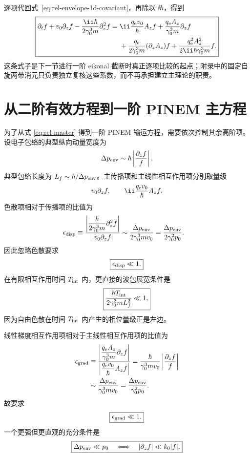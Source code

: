 逐项代回式~\eqref{eq:rel-envelope-1d-covariant}，再除以 $\ii\hbar$，得到
\begin{equation}
\boxed{
\begin{aligned}
\partial_tf+v_0\partial_zf
-\frac{\ii\hbar}{2\gamma_0^3m}\partial_z^2f
={}&\ii\frac{q_{\rm e}v_0}{\hbar}A_zf
+\frac{q_{\rm e}A_z}{\gamma_0^3m}\partial_zf\\
&+\frac{q_{\rm e}}{2\gamma_0^3m}(\partial_zA_z)f
+\frac{q_{\rm e}^2A_z^2}{2\ii\hbar\gamma_0^3m}f.
\end{aligned}}
\label{eq:rel-master}
\end{equation}
这条式子是下一节进行一阶 eikonal 截断时真正逐项比较的起点；附录中的固定自旋两带消元只负责独立复核这些系数，而不再承担建立主理论的职责。



\section{从二阶有效方程到一阶 PINEM 主方程}

为了从式 \eqref{eq:rel-master} 得到一阶 PINEM 输运方程，需要依次控制其余高阶项。设电子包络的典型纵向动量宽度为
\[
 \Delta p_{\rm env}\sim\hbar\left|\frac{\partial_z f}{f}\right|,
\]
典型包络长度为 $L_f\sim\hbar/\Delta p_{\rm env}$。主传播项和主线性相互作用项分别取量级
\[
 v_0\partial_zf,
 \qquad
 \ii\frac{q_{\rm e}v_0}{\hbar}A_zf.
\]
色散项相对于传播项的比值为
\begin{align}
 \epsilon_{\rm disp}
 &\equiv
 \frac{\left|\dfrac{\hbar}{2\gamma_0^3m}\partial_z^2f\right|}
 {\left|v_0\partial_zf\right|}
 \sim\frac{\Delta p_{\rm env}}{2\gamma_0^3mv_0}
 =\frac{\Delta p_{\rm env}}{2\gamma_0^2p_0}.
 \label{eq:eps-disp}
\end{align}
因此忽略色散要求
\begin{equation}
 \boxed{\epsilon_{\rm disp}\ll1.}
 \label{eq:disp-condition}
\end{equation}
在有限相互作用时间 $T_{\rm int}$ 内，更直接的波包展宽条件是
\begin{equation}
 \boxed{
 \frac{\hbar T_{\rm int}}{2\gamma_0^3mL_f^2}\ll1,}
 \label{eq:disp-time-condition}
\end{equation}
因为自由色散在时间 $T_{\rm int}$ 内产生的相位量级正是左边。

线性梯度相互作用项相对于主线性相互作用项的比值为
\begin{align}
 \epsilon_{\rm grad}
 &\equiv
 \frac{\left|\dfrac{q_{\rm e}A_z}{\gamma_0^3m}\partial_zf\right|}
 {\left|\dfrac{q_{\rm e}v_0}{\hbar}A_zf\right|}
 =\frac{\hbar}{\gamma_0^3mv_0}
 \left|\frac{\partial_zf}{f}\right|\\
 &\sim\frac{\Delta p_{\rm env}}{\gamma_0^3mv_0}
 =\frac{\Delta p_{\rm env}}{\gamma_0^2p_0}.
 \label{eq:eps-grad}
\end{align}
故要求
\begin{equation}
 \boxed{\epsilon_{\rm grad}\ll1.}
 \label{eq:grad-condition}
\end{equation}
一个更强但更直观的充分条件是
\begin{equation}
 \boxed{\Delta p_{\rm env}\ll p_0
 \quad\Longleftrightarrow\quad
 \left|\partial_zf\right|\ll k_0|f|.}
 \label{eq:slow-envelope-condition}
\end{equation}

